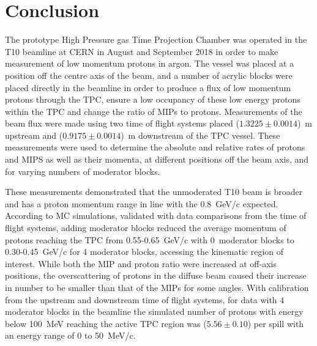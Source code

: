 \section{Conclusion}
\label{hptpcPaper:sec:Conclusion}

The prototype High Pressure gas Time Projection Chamber was operated in the T10 beamline at CERN in August and September 2018 in order to make measurement of low momentum protons in argon.
The vessel was placed at a position off the centre axis of the beam, and a number of acrylic blocks were placed directly in the beamline in order to produce a flux of low momentum protons through the TPC, ensure a low occupancy of these low energy protons within the TPC and change the ratio of MIPs to protons.
Measurements of the beam flux were made using two time of flight systems placed ($1.3225 \pm 0.0014$)~m upstream and ($0.9175 \pm 0.0014$)~m downstream of the TPC vessel.
These measurements were used to determine the absolute and relative rates of protons and MIPS as well as their momenta, at different positions off the beam axis, and for varying numbers of moderator blocks.

These measurements demonstrated that the unmoderated T10 beam is broader and has a proton momentum range in line with the 0.8~GeV/c expected.
According to MC simulations, validated with data comparisons from the time of flight systems, adding moderator blocks reduced the average momentum of protons reaching the TPC from 0.55-0.65~GeV/c with 0~moderator blocks to 0.30-0.45~GeV/c for 4 moderator blocks, accessing the kinematic region of interest.
While both the MIP and proton ratio were increased at off-axis positions, the overscattering of protons in the diffuse beam caused their increase in number to be smaller than that of the MIPs for some angles.
With calibration from the upstream and downstream time of flight systems, for data with 4 moderator blocks in the beamline the simulated number of protons with energy below 100~MeV reaching the active TPC region was ($5.56 \pm  0.10$) per spill with an energy range of 0 to 50~MeV/c.


